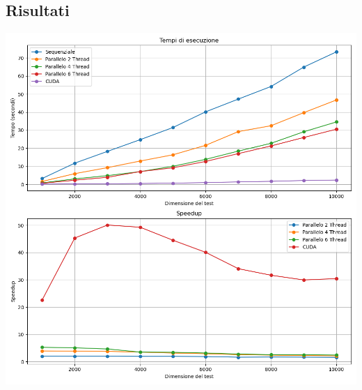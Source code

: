 \documentclass[11pt]{article}
\begin{document}
    \subsection{Risultati}\label{subsec:plots}
    \includegraphics[width=\textwidth]{plots/results}
\end{document}
